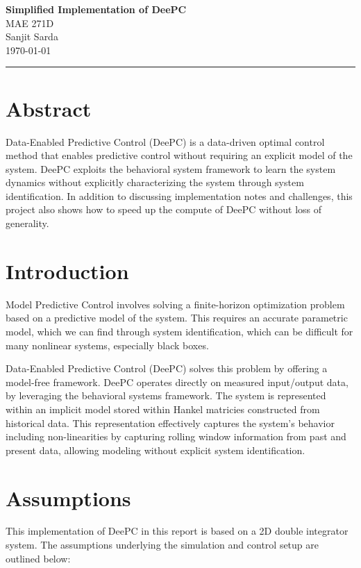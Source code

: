 \documentclass[11pt,a4paper]{article}
\begin{document}
\begin{center}
    \Large\textbf{Simplified Implementation of DeePC} \\
    \normalsize
    MAE 271D \\
    Sanjit Sarda \\
    \today
\end{center}

\vspace{1em}
\hrule
\vspace{2em}


\section{Abstract}
Data-Enabled Predictive Control (DeePC) is a data-driven optimal control method that enables predictive control without requiring an explicit model of the system. DeePC exploits the behavioral system framework to learn the system dynamics without explicitly characterizing the system through system identification. In addition to discussing implementation notes and challenges, this project also shows how to speed up the compute of DeePC without loss of generality.


\section{Introduction}

Model Predictive Control involves solving a finite-horizon optimization problem based on a predictive model of the system. This requires an accurate parametric model, which we can find through system identification, which can be difficult for many nonlinear systems, especially black boxes.

Data-Enabled Predictive Control (DeePC) solves this problem by offering a model-free framework. DeePC operates directly on measured input/output data, by leveraging the behavioral systems framework. The system is represented within an implicit model stored within Hankel matricies constructed from historical data. This representation effectively captures the system's behavior including non-linearities by capturing rolling window information from past and present data, allowing modeling without explicit system identification.

\section{Assumptions}
This implementation of DeePC in this report is based on a 2D double integrator system. The assumptions underlying the simulation and control setup are outlined below:
\end{document}
